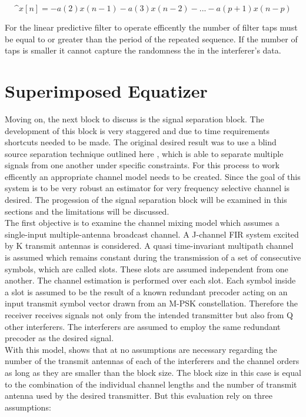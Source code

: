 \[ \^{x}[n]=-a(2)x(n-1)-a(3)x(n-2)-...-a(p+1)x(n-p)\]

For the linear predictive filter to operate efficently the number of filter taps must be equal to or greater than the period of the repeated sequence.  If the number of taps is smaller it cannot capture the randomness the in the interferer's data.\\

\section{Superimposed Equatizer}

Moving on, the next block to discuss is the signal separation block.  The development of this block is very staggered and due to time requirements shortcuts needed to be made.  The original desired result was to use a blind source separation technique outlined here \cite{AMUSE}, which is able to separate multiple signals from one another under specific constraints.  For this process to work efficently an appropriate channel model needs to be created.  Since the goal of this system is to be very robust an estimator for very frequency selective channel is desired.  The progession of the signal separation block will be examined in this sections and the limitations will be discussed.\\

The first objective is to examine the channel mixing model which assumes a single-input multiple-antenna broadcast channel.  A J-channel FIR system excited by K transmit antennas is considered. A quasi time-invariant multipath channel is assumed which remains constant during the transmission of a set of consecutive symbols, which are called slots. These slots are assumed independent from one another.  The channel estimation is performed over each slot. Each symbol inside a slot is assumed to be the result of a known redundant precoder acting on an input transmit symbol vector drawn from an M-PSK constellation. Therefore the receiver receives signals not only from the intended transmitter but also from Q other interferers. The interferers are assumed to employ the same redundant precoder as the desired signal\cite{skrkantPHD}.\\

With this model, \cite{midterm_report} shows that at no assumptions are necessary regarding the number of the transmit antennas of each of the interferers and the channel orders as long as they are smaller than the block size.  The block size in this case is equal to the combination of the individual channel lengths and the number of transmit antenna used by the desired transmitter.  But this evaluation rely on three assumptions:\\

